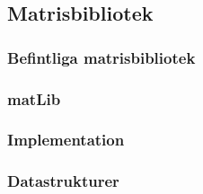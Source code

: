 \subsection{Matrisbibliotek}

\subsubsection{Befintliga matrisbibliotek}

\subsubsection{matLib}

\subsubsection{Implementation}

\subsubsection{Datastrukturer}